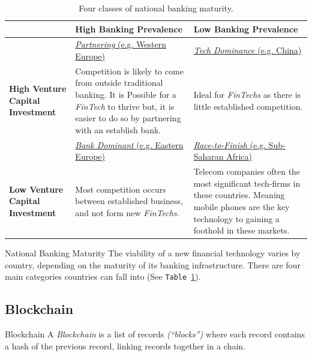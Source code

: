 \documentclass[11pt,a4paper]{article}
\begin{document}
  \begin{table}[ht!]
    \begin{tabular}{|p{}|p{}|p{}|}
      \hline
      &\textbf{High Banking Prevalence}&\textbf{Low Banking Prevalence}\\\hline

      &\underline{\textit{Partnering} (e.g. Western Europe)}&\underline{\textit{Tech Dominance} (e.g. China)}\\
      \textbf{High Venture Capital Investment}&Competition is likely to come from outside traditional banking. It is Possible for a \textit{FinTech} to thrive but, it is easier to do so by partnering with an establish bank.&Ideal for \textit{FinTechs} as there is little established competition.\\
      \hline

      &\underline{\textit{Bank Dominant} (e.g. Eastern Europe)}&\underline{\textit{Race-to-Finish} (e.g. Sub-Saharan Africa)}\\
      \textbf{Low Venture Capital Investment}&Most competition occurs between established business, and not form new \textit{FinTechs}.&Telecom companies often the most significant tech-firms in these countries. Meaning mobile phones are the key technology to gaining a foothold in these markets.\\
      \hline
    \end{tabular}
    \caption{Four classes of national banking maturity.}
    \label{tab_BankingMaturity}
  \end{table}

  \begin{proposition}{National Banking Maturity}
    The viability of a new financial technology varies by country, depending on the maturity of its banking infrastructure. There are four main categories countries can fall into (See \texttt{Table \ref{tab_BankingMaturity}}).
  \end{proposition}

\subsection{Blockchain} \label{sec_Blockchain}

  \begin{definition}{Blockchain}
    A \textit{Blockchain} is a list of records \textit{(``blocks'')} where each record contains a hash of the previous record, linking records together in a chain.
  \end{definition}
\end{document}

